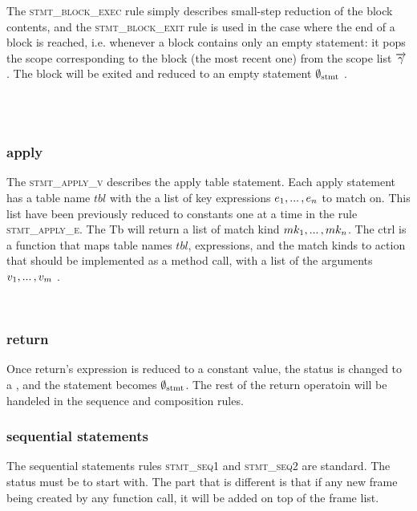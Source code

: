 \documentclass[UTF8]{article}
\begin{document}
The \textsc{stmt\_block\_exec} rule simply describes small-step reduction of the block contents, and the \textsc{stmt\_block\_exit} rule is used in the case where the end of a block is reached, i.e. whenever a block contains only an empty statement: it pops the scope corresponding to the block (the most recent one) from the scope list $\overrightarrow{\gamma}$. The block will be exited and reduced to an empty statement $\emptyset_{ \mathrm{stmt} }{}$ .

\begin{figure}[ht!]
    \ottusedrule{\ottdrulestmtXXblockXXenter{}} \\
    \ottusedrule{\ottdrulestmtXXblockXXexec{}} \\
    \ottusedrule{\ottdrulestmtXXblockXXexit{}} 
\end{figure}


\subsubsection*{apply} 
The \textsc{stmt\_apply\_v} describes the apply table statement. Each apply statement has a table name $tbl$ with the a list of key expressions $e_1 , ... \, , e_n$ to match on. This list have been previously reduced to constants one at a time in the rule \textsc{stmt\_apply\_e}. The Tb will return a list of match kind $mk_1 , ... \, , mk_n$. The ctrl is a function that maps table names $tbl$, expressions, and the match kinds to action that should be implemented as a method call, with a list of the arguments $v_1 , ... \, , v_m $ .


\begin{figure}[ht!]
    \ottusedrule{\ottdrulestmtXXapplyXXtableXXe{}} \\
    \ottusedrule{\ottdrulestmtXXapplyXXtableXXv{}} 
\end{figure}

\subsubsection*{return}
Once return's expression is reduced to a constant value, the status is changed to a \returnst{} \cval, and the statement becomes $\emptyset_{ \mathrm{stmt} }{}$. The rest of the return operatoin will be handeled in the sequence and composition rules.

\begin{figure}[ht!]
    \ottusedrule{\ottdrulestmtXXreturnXXv{}} 
\end{figure}

\subsubsection*{sequential statements}
The sequential statements rules \textsc{stmt\_seq1} and \textsc{stmt\_seq2} are standard. The status \status{} must be \running{} to start with. The part that is different is that if any new frame being created by any function call, it will be added on top of the frame list. \\
\end{document}
